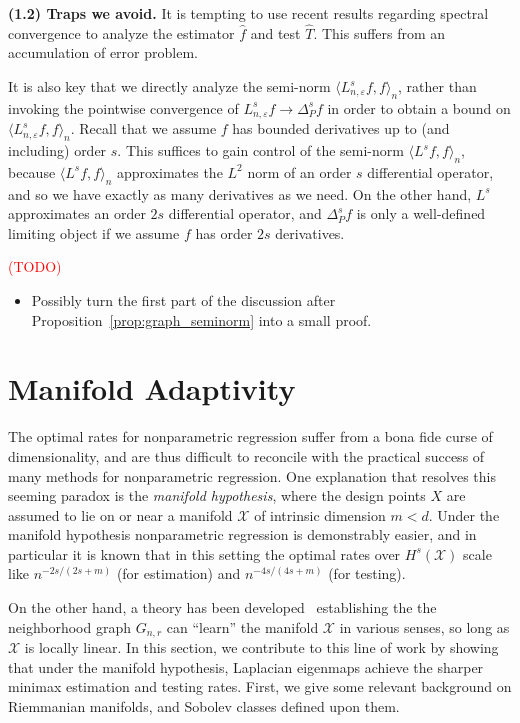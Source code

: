\documentclass{article}
\newcommand{\1}{\mathbf{1}}
\newcommand{\Xset}{\mathcal{X}}
\newcommand{\Leb}{L}
\newcommand{\mc}[1]{\mathcal{#1}}
\newcommand{\dotp}[2]{\langle #1, #2 \rangle}
\newcommand{\wh}[1]{\widehat{#1}}
\theoremstyle{alden}
\theoremstyle{aldenthm}
\theoremstyle{definition}
\theoremstyle{remark}
\begin{document}
\textbf{(1.2) Traps we avoid.} It is tempting to use recent results regarding spectral convergence to analyze the estimator $\wh{f}$ and test $\wh{T}$. This suffers from an accumulation of error problem. 

It is also key that we directly analyze the semi-norm $\dotp{L_{n,\varepsilon}^s f}{f}_n$, rather than invoking the pointwise convergence of $L_{n,\varepsilon}^{s}f \to \Delta_P^{s}f$ in order to obtain a bound on $\dotp{L_{n,\varepsilon}^s f}{f}_n$. Recall that we assume $f$ has bounded derivatives up to (and including) order $s$. This suffices to gain control of the semi-norm $\dotp{L^s f}{f}_n$, because $\dotp{L^s f}{f}_n$ approximates the $\Leb^2$ norm of an order $s$ differential operator, and so we have exactly as many derivatives as we need. On the other hand, $L^s$ approximates an order $2s$ differential operator, and $\Delta_P^sf$ is only a well-defined limiting object if we assume $f$ has order $2s$ derivatives. 

\textcolor{red}{(TODO)}
\begin{itemize}
	\item Possibly turn the first part of the discussion after Proposition~\ref{prop:graph_seminorm} into a small proof.
\end{itemize}


\section{Manifold Adaptivity}
\label{sec:manifold_adaptivity}

The optimal rates for nonparametric regression suffer from a bona fide curse of dimensionality, and are thus difficult to reconcile with the practical success of many methods for nonparametric regression. One explanation that resolves this seeming paradox is the \emph{manifold hypothesis}, where the design points $X$ are assumed to lie on or near a manifold $\mc{X}$ of intrinsic dimension $m < d$. Under the manifold hypothesis nonparametric regression is demonstrably easier, and in particular it is known \citep{bickel2007,ariascastro2018} that in this setting the optimal rates over $H^s(\Xset)$ scale like $n^{-2s/(2s + m)}$ (for estimation) and $n^{-4s/(4s + m)}$ (for testing). 

On the other hand, a theory has been developed~\citep{belkin03,belkin05,niyogi2013} establishing the the neighborhood graph $G_{n,r}$ can ``learn'' the manifold $\Xset$ in various senses, so long as $\Xset$ is locally linear. In this section, we contribute to this line of work by showing that under the manifold hypothesis, Laplacian eigenmaps achieve the sharper minimax estimation and testing rates. First, we give some relevant background on Riemmanian manifolds, and Sobolev classes defined upon them.
\end{document}
